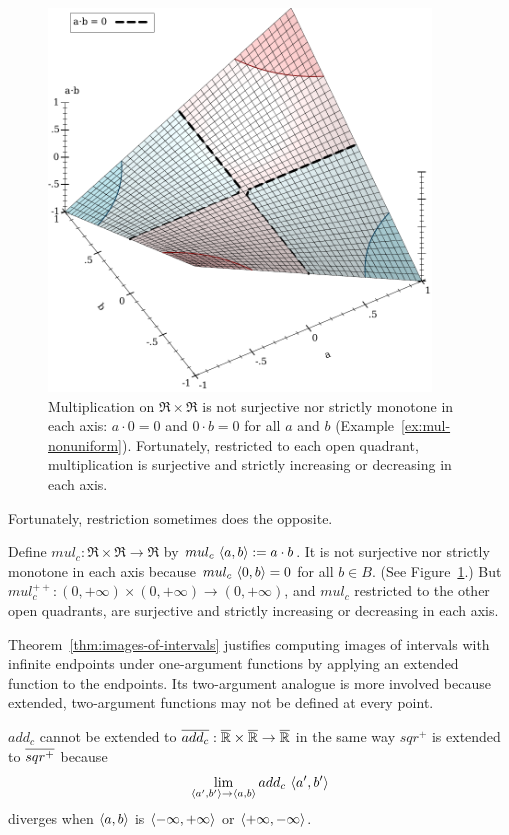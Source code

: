 \begin{figure}[!tb]
\centering
\includegraphics[width=4in]{figures/mul-nonuniform-properties}
\caption[Multiplication on $\Re \times \Re$]{Multiplication on $\Re \times \Re$ is not surjective nor strictly monotone in each axis: $a \cdot 0 = 0$ and $0 \cdot b = 0$ for all $a$ and $b$ (Example~\ref{ex:mul-nonuniform}).
Fortunately, restricted to each open quadrant, multiplication is surjective and strictly increasing or decreasing in each axis.}
\label{fig:mul-nonuniform}
\end{figure}

Fortunately, restriction sometimes does the opposite.

\begin{example}
\label{ex:mul-nonuniform}
Define $mul_c : \Re \times \Re \to \Re$ by $mul_c~\langle{a,b}\rangle := a \cdot b$.
It is not surjective nor strictly monotone in each axis because $mul_c~\langle{0,b}\rangle = 0$ for all $b \in B$.
(See Figure~\ref{fig:mul-nonuniform}.)
But $mul_c^{++} : (0,+\infty) \times (0,+\infty) \to (0,+\infty)$, and $mul_c$ restricted to the other open quadrants, are surjective and strictly increasing or decreasing in each axis.
\exampleqed
\end{example}

Theorem~\ref{thm:images-of-intervals} justifies computing images of intervals with infinite endpoints under one-argument functions by applying an extended function to the endpoints.
Its two-argument analogue is more involved because extended, two-argument functions may not be defined at every point.

\begin{example}
$add_c$ cannot be extended to $\cl{add_c} : \cl{\Re} \times \cl{\Re} \to \cl{\Re}$ in the same way $sqr^+$ is extended to $\cl{sqr^+}$ because
\begin{equation}
	\lim_{\langle{a',b'}\rangle \to \langle{a,b}\rangle} add_c~\langle{a',b'}\rangle
\end{equation}
diverges when $\langle{a,b}\rangle$ is $\langle{-\infty,+\infty}\rangle$ or $\langle{+\infty,-\infty}\rangle$.
\exampleqed
\end{example}


